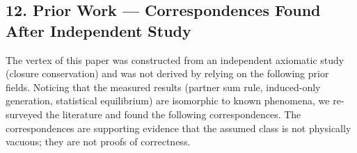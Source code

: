 \documentclass[
  a4paper,
]{article}
\begin{document}
\subsection{12. Prior Work --- Correspondences Found After Independent
Study}\label{prior-work-correspondences-found-after-independent-study}

The vertex of this paper was constructed from an independent axiomatic
study (closure conservation) and was not derived by relying on the
following prior fields. Noticing that the measured results (partner sum
rule, induced-only generation, statistical equilibrium) are isomorphic
to known phenomena, we re-surveyed the literature and found the
following correspondences. The correspondences are supporting evidence
that the assumed class is not physically vacuous; they are not proofs of
correctness.
\end{document}
